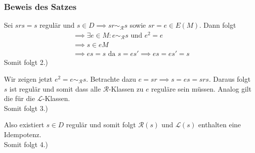 \documentclass[12pt, german]{article}
\newcommand{\grer}{\sim_{\mathcal{R}}}
\newcommand{\lcal}{\mathcal L}
\newcommand{\rcal}{\mathcal R}
\begin{document}
	\subsubsection{Beweis des Satzes}
	Sei $srs = s$ regulär und $s \in D \implies sr \grer s$ sowie $sr = e \in E(M)$. Dann folgt 
	\begin{align*}
		&\implies \exists e \in M: e \grer s \text{ und } e^2 = e \\
		&\implies s \in eM \\
		&\implies es = s \text{ da } s=es' \implies es = es' = s
	\end{align*}
	Somit folgt 2.)
	\newline
	
	Wir zeigen jetzt $e^2 = e \grer s$. Betrachte dazu $e=sr \implies s = es = srs$. Daraus folgt $s$ ist regulär und somit dass alle $\rcal$-Klassen zu $e$ reguläre sein müssen.
	Analog gilt die für die $\lcal$-Klassen. \\
	Somit folgt 3.)
	\newline
	
	Also existiert $s \in D$ regulär und somit folgt $\rcal(s)$ und $\lcal(s)$ enthalten eine Idempotenz. \\
	Somit folgt 4.)
	
\end{document}
